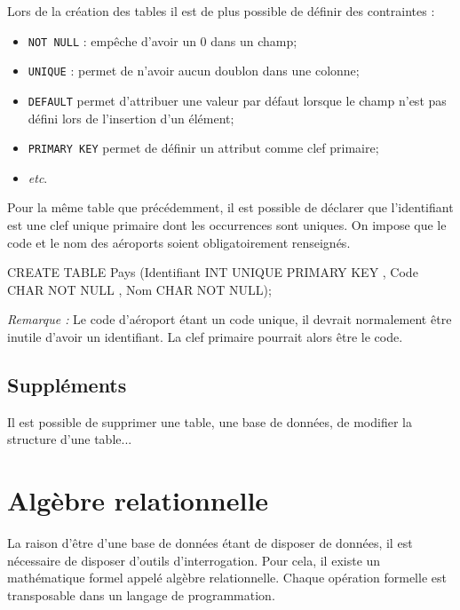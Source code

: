\documentclass[10pt]{article}
\begin{document}
Lors de la création des tables il est de plus possible de définir des contraintes :
\begin{itemize}
\item \texttt{NOT NULL} : empêche d'avoir un 0 dans un champ;
\item \texttt{UNIQUE} : permet de n'avoir aucun doublon dans une colonne;
\item \texttt{DEFAULT} permet d'attribuer une valeur par défaut lorsque le champ n'est pas défini lors de l'insertion d'un élément;
\item \texttt{PRIMARY KEY} permet de définir un attribut comme clef primaire;
\item \textit{etc}.
\end{itemize}

\begin{exemple}
Pour la même table que précédemment, il est possible de déclarer que l'identifiant est une clef unique primaire dont les occurrences sont uniques. On impose que le code et le nom des aéroports soient obligatoirement renseignés.


\begin{envsql}
\begin{sql}
CREATE TABLE Pays (Identifiant INT UNIQUE PRIMARY KEY , Code CHAR NOT NULL , Nom CHAR NOT NULL);
\end{sql}
\end{envsql}
\textit{Remarque : } Le code d'aéroport étant un code unique, il devrait normalement être inutile d'avoir un identifiant. La clef primaire pourrait alors être le code. 

\end{exemple}

\subsection{Suppléments}
Il est possible de supprimer une table, une base de données, de modifier la structure d'une table...
\section{Algèbre relationnelle}
La raison d'être d'une base de données étant de disposer de données, il est nécessaire de disposer d'outils d'interrogation. Pour cela, il existe un mathématique formel appelé algèbre relationnelle. Chaque opération formelle est transposable dans un langage de programmation. 
\end{document}
